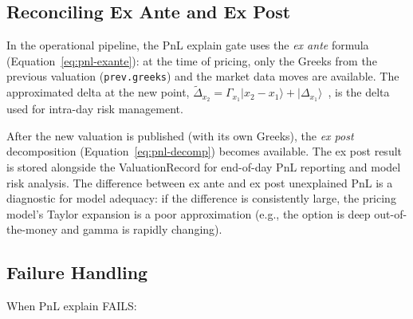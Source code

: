 \documentclass[11pt,a4paper]{article}
\begin{document}
\subsection{Reconciling Ex Ante and Ex Post}

In the operational pipeline, the PnL explain gate uses the \emph{ex ante} formula (Equation~\ref{eq:pnl-exante}): at the time of pricing, only the Greeks from the previous valuation (\texttt{prev.greeks}) and the market data moves are available.  The approximated delta at the new point, $\tilde{\Delta}_{x_2} = \Gamma_{x_1}|x_2 - x_1\rangle + |\Delta_{x_1}\rangle$~\cite[\S4.1]{pnl_explain}, is the delta used for intra-day risk management.

After the new valuation is published (with its own Greeks), the \emph{ex post} decomposition (Equation~\ref{eq:pnl-decomp}) becomes available.  The ex post result is stored alongside the ValuationRecord for end-of-day PnL reporting and model risk analysis.  The difference between ex ante and ex post unexplained PnL is a diagnostic for model adequacy: if the difference is consistently large, the pricing model's Taylor expansion is a poor approximation (e.g., the option is deep out-of-the-money and gamma is rapidly changing).

\subsection{Failure Handling}

When PnL explain FAILS:
\end{document}
